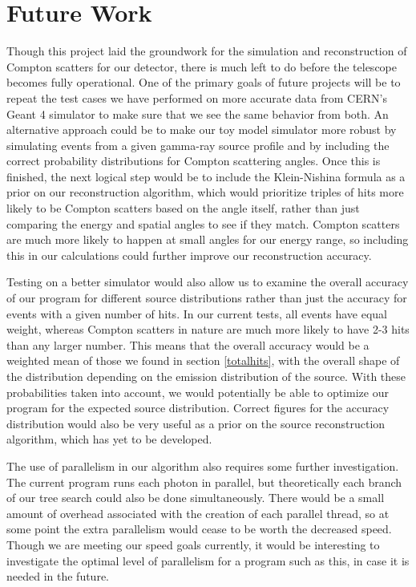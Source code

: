 \section{Future Work}
Though this project laid the groundwork for the simulation and reconstruction of Compton scatters for our detector, there is much left to do before the telescope becomes fully operational. One of the primary goals of future projects will be to repeat the test cases we have performed on more accurate data from CERN's Geant 4 simulator to make sure that we see the same behavior from both. An alternative approach could be to make our toy model simulator more robust by simulating events from a given gamma-ray source profile and by including the correct probability distributions for Compton scattering angles. Once this is finished, the next logical step would be to include the Klein-Nishina formula as a prior on our reconstruction algorithm, which would prioritize triples of hits more likely to be Compton scatters based on the angle itself, rather than just comparing the energy and spatial angles to see if they match. Compton scatters are much more likely to happen at small angles for our energy range, so including this in our calculations could further improve our reconstruction accuracy.

Testing on a better simulator would also allow us to examine the overall accuracy of our program for different source distributions rather than just the accuracy for events with a given number of hits. In our current tests, all events have equal weight, whereas Compton scatters in nature are much more likely to have 2-3 hits than any larger number. This means that the overall accuracy would be a weighted mean of those we found in section \ref{totalhits}, with the overall shape of the distribution depending on the emission distribution of the source. With these probabilities taken into account, we would potentially be able to optimize our program for the expected source distribution. Correct figures for the accuracy distribution would also be very useful as a prior on the source reconstruction algorithm, which has yet to be developed.

The use of parallelism in our algorithm also requires some further investigation. The current program runs each photon in parallel, but theoretically each branch of our tree search could also be done simultaneously. There would be a small amount of overhead associated with the creation of each parallel thread, so at some point the extra parallelism would cease to be worth the decreased speed. Though we are meeting our speed goals currently, it would be interesting to investigate the optimal level of parallelism for a program such as this, in case it is needed in the future. 